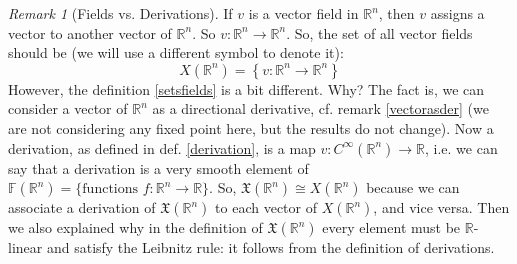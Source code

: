 \documentclass[a4paper,11pt,titlepage, article, oneside]{memoir}
\numberwithin{equation}{section}
\theoremstyle{definition}
\theoremstyle{remark}
\newtheorem{remark}[theorem]{Remark}
\newcommand{\rfield}{\mathbb{R}}
\begin{document}
\begin{remarkbox}\begin{remark} [Fields vs. Derivations] \label{fieldsvsder}
  If $v$ is a vector field in $\rfield^n$, then $v$ assigns a vector to another vector of $\rfield^n$. So $v \colon \rfield^n \rightarrow \rfield^n$. So, the set of all vector fields should be (we will use a different symbol to denote it):
  $$X(\rfield^n) = \left \{ v \colon \rfield^n \rightarrow \rfield^n \right \}$$
  However, the definition \ref{setsfields} is a bit different. Why?
  The fact is, we can consider a vector of $\rfield^n$ as a directional derivative, cf. remark \ref{vectorasder} (we are not considering any fixed point here, but the results do not change). Now a derivation, as defined in def. \ref{derivation}, is a map $v \colon C^{\infty}(\rfield^n) \rightarrow \rfield$, i.e. we can say that a derivation is a very smooth element of $\mathbb{F}(\rfield^n) = \{ \text{functions } f \colon \rfield^n \rightarrow \rfield\}$. So, $\mathfrak{X}(\rfield^n) \cong X(\rfield^n)$ because we can associate a derivation of $\mathfrak{X}(\rfield^n)$ to each vector of $X(\rfield^n)$, and vice versa. Then we also explained why in the definition of $\mathfrak{X}( \rfield^n)$ every element must be $\rfield$-linear and satisfy the Leibnitz rule: it follows from the definition of derivations.


\end{remark}
\end{remarkbox}
\end{document}
